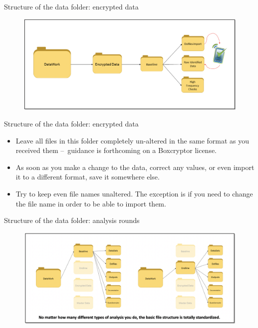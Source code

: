\documentclass[aspectratio=169]{beamer}
\begin{document}
\begin{frame}{Structure of the data folder: encrypted data}

	\begin{figure}
		\centering
		\includegraphics[width=\linewidth]{img/Structure5}
	\end{figure}

\end{frame}

\begin{frame}{Structure of the data folder: encrypted data}

	\begin{itemize}[<default overlay specification>]
	\item<1> Leave all files in this folder completely un-altered in the same format as you received them – guidance is forthcoming on a Boxcryptor license. 
	\item<1> As soon as you make a change to the data, correct any values, or even import it to a different format, save it somewhere else. 
	\item<1> Try to keep even file names unaltered. The exception is if you need to change the file name in order to be able to import them.
	\end{itemize}

\end{frame}


\begin{frame}{Structure of the data folder: analysis rounds}

	\begin{figure}
		\centering
		\includegraphics[width=\linewidth]{img/Structure6}
	\end{figure}

\end{frame}
\end{document}
